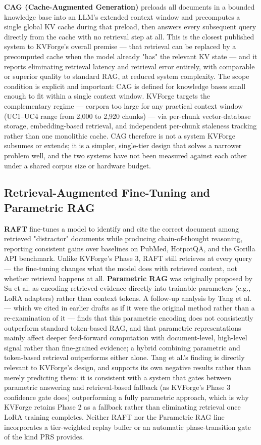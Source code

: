 \documentclass[10pt,twocolumn]{article}
\begin{document}
\textbf{CAG (Cache-Augmented Generation)} \cite{ref25} preloads all documents in a bounded knowledge base into an LLM's extended context window and precomputes a single global KV cache during that preload, then answers every subsequent query directly from the cache with no retrieval step at all. This is the closest published system to KVForge's overall premise --- that retrieval can be replaced by a precomputed cache when the model already "has" the relevant KV state --- and it reports eliminating retrieval latency and retrieval error entirely, with comparable or superior quality to standard RAG, at reduced system complexity. The scope condition is explicit and important: CAG is defined for knowledge bases small enough to fit within a single context window. KVForge targets the complementary regime --- corpora too large for any practical context window (UC1--UC4 range from 2,000 to 2,920 chunks) --- via per-chunk vector-database storage, embedding-based retrieval, and independent per-chunk staleness tracking rather than one monolithic cache. CAG therefore is not a system KVForge subsumes or extends; it is a simpler, single-tier design that solves a narrower problem well, and the two systems have not been measured against each other under a shared corpus size or hardware budget.


\subsection{Retrieval-Augmented Fine-Tuning and Parametric RAG}

\textbf{RAFT} \cite{ref26} fine-tunes a model to identify and cite the correct document among retrieved "distractor" documents while producing chain-of-thought reasoning, reporting consistent gains over baselines on PubMed, HotpotQA, and the Gorilla API benchmark. Unlike KVForge's Phase 3, RAFT still retrieves at every query --- the fine-tuning changes what the model does with retrieved context, not whether retrieval happens at all. \textbf{Parametric RAG} was originally proposed by Su et al. \cite{ref27} as encoding retrieved evidence directly into trainable parameters (e.g., LoRA adapters) rather than context tokens. A follow-up analysis by Tang et al. \cite{ref44} --- which we cited in earlier drafts as if it were the original method rather than a re-examination of it --- finds that this parametric encoding does not consistently outperform standard token-based RAG, and that parametric representations mainly affect deeper feed-forward computation with document-level, high-level signal rather than fine-grained evidence; a hybrid combining parametric and token-based retrieval outperforms either alone. Tang et al.'s finding is directly relevant to KVForge's design, and supports its own negative results rather than merely predicting them: it is consistent with a system that gates between parametric answering and retrieval-based fallback (as KVForge's Phase 3 confidence gate does) outperforming a fully parametric approach, which is why KVForge retains Phase 2 as a fallback rather than eliminating retrieval once LoRA training completes. Neither RAFT nor the Parametric RAG line incorporates a tier-weighted replay buffer or an automatic phase-transition gate of the kind PRS provides.
\end{document}
